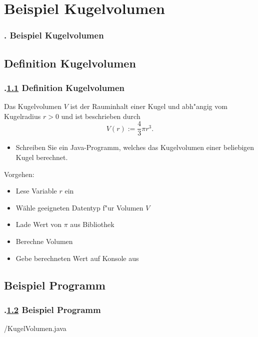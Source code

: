 \AtBeginSection{}
\section{Beispiel Kugelvolumen}
\begin{frame}
  \frametitle{\kap. Beispiel Kugelvolumen}%
\tableofcontents[current]
\end{frame}


\def\stitle{Definition Kugelvolumen}%
\subsection{\stitle}\label{S:BeispielKugelvolumen}
\begin{frame}[t]%
  \frametitle{\kap.\ref{S:BeispielKugelvolumen} \stitle}%
\medskip

Das Kugelvolumen $V$ ist der Rauminhalt einer Kugel und abh"angig vom Kugelradius $r>0$ und ist beschrieben durch
$$ V(r) := \frac{4}{3} \pi r^3. $$
\begin{itemize}
  \item Schreiben Sie ein Java-Programm, welches das Kugelvolumen einer beliebigen Kugel berechnet.
\end{itemize}
\medskip

Vorgehen:
\begin{itemize}
\item Lese Variable $r$ ein
\item W\"ahle geeigneten Datentyp f"ur Volumen $V$
\item Lade Wert von $\pi$ aus Bibliothek
\item Berechne Volumen
\item Gebe berechneten Wert auf Konsole aus
\end{itemize}
\end{frame}


\def\stitle{Beispiel Programm}%
\subsection{\stitle}\label{S:BeispielProgramm}
\begin{frame}[t]%
  \frametitle{\kap.\ref{S:BeispielProgramm} \stitle}%


{\getexercisefolder/KugelVolumen.java}
\end{frame}


